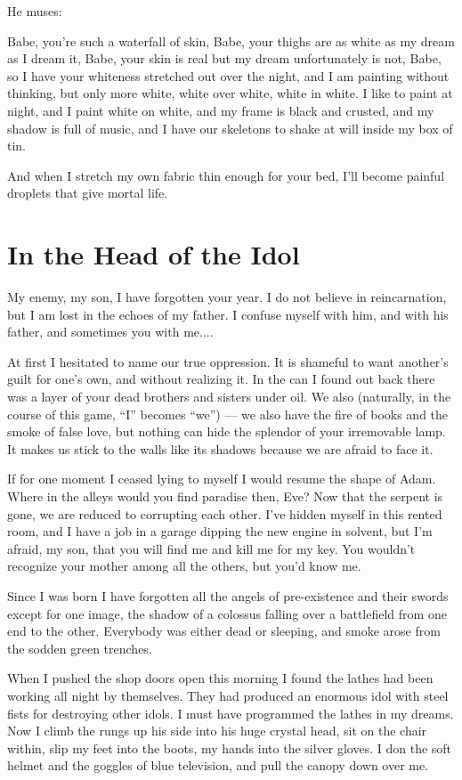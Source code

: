 \documentclass[english,11pt,letterpaper,onecolumn,parskip=full]{scrbook}
\begin{document}
He muses:

Babe, you're such a waterfall of skin, Babe, your thighs are as white as my dream as I dream it, Babe, your skin is real but my dream unfortunately is not, Babe, so I have your whiteness stretched out over the night, and I am painting without thinking, but only more white, white over white, white in white.  I like to paint at night, and I paint white on white, and my frame is black and crusted, and my shadow is full of music, and I have our skeletons to shake at will inside my box of tin.

And when I stretch my own fabric thin enough for your bed, I'll become painful droplets that give mortal life.

\newpage
\section{In the Head of the Idol}
	My enemy, my son, I have forgotten your year.  I do not believe in reincarnation, but I am lost in the echoes of my father.  I confuse myself with him, and with his father, and sometimes you with me....
	
	At first I hesitated to name our true oppression.  It is shameful to want another's guilt for one's own, and without realizing it.  In the can I found out back there was a layer of your dead brothers and sisters under oil.  We also (naturally, in the course of this game, ``I'' becomes ``we'') --- we also have the fire of books and the smoke of false love, but nothing can hide the splendor of your irremovable lamp.  It makes us stick to the walls like its shadows because we are afraid to face it.
	
	If for one moment I ceased lying to myself I would resume the shape of Adam.  Where in the alleys would you find paradise then, Eve?  Now that the serpent is gone, we are reduced to corrupting each other.  I've hidden myself in this rented room, and I have a job in a garage dipping the new engine in solvent, but I'm afraid, my son, that you will find me and kill me for my key.  You wouldn't recognize your mother among all the others, but you'd know me.

	Since I was born I have forgotten all the angels of pre-existence and their swords except for one image, the shadow of a colossus falling over a battlefield from one end to the other.  Everybody was either dead or sleeping, and smoke arose from the sodden green trenches.

	When I pushed the shop doors open this morning I found the lathes had been working all night by themselves.  They had produced an enormous idol with steel fists for destroying other idols.  I must have programmed the lathes in my dreams.  Now I climb the rungs up his side into his huge crystal head, sit on the chair within, slip my feet into the boots, my hands into the silver gloves.  I don the soft helmet and the goggles of blue television, and pull the canopy down over me.
\end{document}
